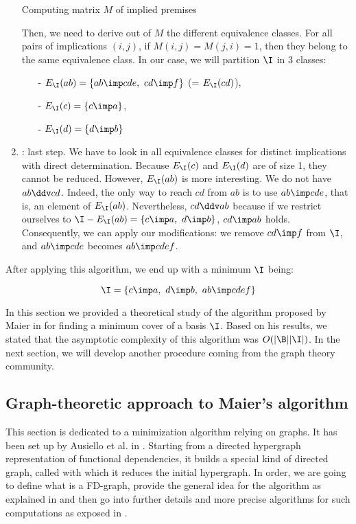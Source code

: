 \begin{enumerate}
\begin{table}[ht]
{		}
		\caption{Computing matrix $M$ of implied premises}
		\label{tab:Maier-Mat}
	\end{table}
	
	\noindent Then, we need to derive out of $M$ the different equivalence 
	classes. For all pairs of implications $(i, j)$, if $M(i, j) = M(j, i) = 1$,
	then they belong to the same equivalence class. In our case, we will 
	partition $\I$ in 3 classes:
	\begin{itemize}
		\item[-] $E_{\I}(ab) = \{ ab \imp cde, \ cd \imp f \}$ (= $E_{\I}(cd)$),
		\item[-] $E_{\I}(c) = \{ c \imp a \}$,
		\item[-] $E_{\I}(d) = \{ d \imp b \}$
	\end{itemize}
	\item {}: last step. We have to look in
	all equivalence classes for distinct implications with direct determination.
	Because $E_{\I}(c)$ and $E_{\I}(d)$ are of size 1, they cannot be reduced.
	However, $E_{\I}(ab)$ is more interesting. We do not have $ab \ddv cd$. 
	Indeed, the only way to reach $cd$ from $ab$ is to use $ab \imp cde$, that 
	is, an element of $E_{\I}(ab)$. Nevertheless, $cd \ddv ab$ because if we 
	restrict ourselves to $\I - E_{\I}(ab) = \{ c \imp a, \ d \imp b \}$, $cd 
	\imp ab$ holds. Consequently, we can apply our modifications: we remove 
	$cd \imp f$ from $\I$, and $ab \imp cde$ becomes $ab \imp cdef$.
\end{enumerate}
After applying this algorithm, we end up with a minimum $\I$ being:

\[ \I = \{ c \imp a, \ d \imp b, \ ab \imp cdef \} \]

\vspace{1.2em}

In this section we provided a theoretical study of the algorithm 
proposed by Maier in \cite{maier_theory_1983, maier_minimum_1980} for finding a 
minimum cover of a basis $\I$. Based on his results, we stated that the  
asymptotic complexity of this algorithm was $O(|\B||\I|)$. In the next section, 
we will develop another procedure coming from the graph theory community.

\subsection{Graph-theoretic approach to Maier's algorithm}

This section is dedicated to a minimization algorithm relying on graphs. 
It has been set up by Ausiello et al. in \cite{ausiello_directed_2017, 
ausiello_graph_1983, ausiello_minimal_1986}. Starting from a directed 
hypergraph representation of functional dependencies, it builds a special kind 
of directed graph, called  with which it reduces the initial 
hypergraph. In order, we are going to define what is a FD-graph, provide the 
general idea for the algorithm as explained in \cite{ausiello_minimal_1986} and 
then go into further details and more precise algorithms for such computations 
as exposed in \cite{ausiello_graph_1983}.

